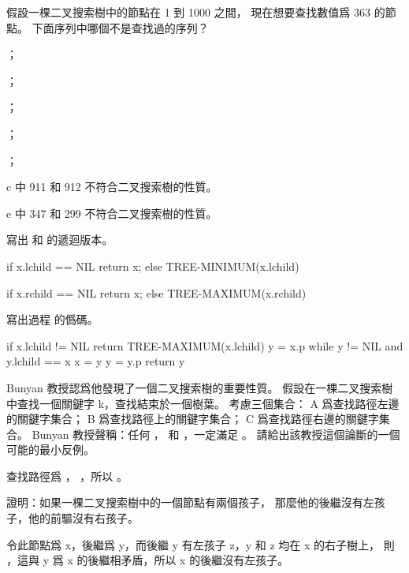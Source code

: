 \startsection[
  title={Querying a binary search tree},
]

\startEXERCISE
假設一棵二叉搜索樹中的節點在 1 到 1000 之間，
現在想要查找數值爲 363 的節點。
下面序列中哪個不是查找過的序列？
\startigBase[a]
\item {}；
\item {}；
\item {}；
\item {}；
\item {}；
\stopigBase
\stopEXERCISE

\startANSWER
c 中 911 和 912 不符合二叉搜索樹的性質。

e 中 347 和 299 不符合二叉搜索樹的性質。
\stopANSWER

\startEXERCISE
寫出  和  的遞迴版本。
\stopEXERCISE

\startANSWER
{}
\startCLRS
if x.lchild == NIL
	return x;
else
	TREE-MINIMUM(x.lchild)
\stopCLRS

\startCLRS
if x.rchild == NIL
	return x;
else
	TREE-MAXIMUM(x.rchild)
\stopCLRS
\stopANSWER

\startEXERCISE
寫出過程  的僞碼。
\stopEXERCISE

\startANSWER
{}
\startCLRS
if x.lchild != NIL
	return TREE-MAXIMUM(x.lchild)
y = x.p
while y != NIL and y.lchild == x
	x = y
	y = y.p
return y
\stopCLRS
\stopANSWER

\startEXERCISE
Bunyan 教授認爲他發現了一個二叉搜索樹的重要性質。
假設在一棵二叉搜索樹中查找一個關鍵字 k，查找結束於一個樹葉。
考慮三個集合： A 爲查找路徑左邊的關鍵字集合；
 B 爲查找路徑上的關鍵字集合； C 爲查找路徑右邊的關鍵字集合。
 Bunyan 教授聲稱：任何 ，  和 ，一定滿足 。
請給出該教授這個論斷的一個可能的最小反例。
\stopEXERCISE

\startANSWER
\externalfigure[output/e12_2_4-1]
查找路徑爲 ， ，所以 。
\stopANSWER

\startEXERCISE
證明：如果一棵二叉搜索樹中的一個節點有兩個孩子，
那麼他的後繼沒有左孩子，他的前驅沒有右孩子。
\stopEXERCISE

\startANSWER
令此節點爲 x，後繼爲 y，而後繼 y 有左孩子 z，y 和 z 均在 x 的右子樹上，
則 ，這與 y 爲 x 的後繼相矛盾，所以 x 的後繼沒有左孩子。

